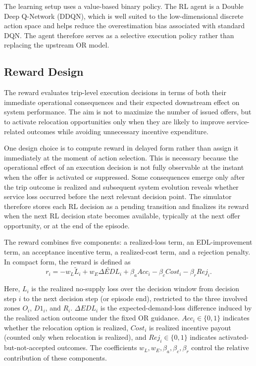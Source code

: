 The learning setup uses a value-based binary policy. The RL agent is a Double Deep Q-Network (DDQN), which is well suited to the low-dimensional discrete action space and helps reduce the overestimation bias associated with standard DQN. The agent therefore serves as a selective execution policy rather than replacing the upstream OR model.

\subsection{Reward Design}

The reward evaluates trip-level execution decisions in terms of both their immediate operational consequences and their expected downstream effect on system performance. The aim is not to maximize the number of issued offers, but to activate relocation opportunities only when they are likely to improve service-related outcomes while avoiding unnecessary incentive expenditure.

One design choice is to compute reward in delayed form rather than assign it immediately at the moment of action selection. This is necessary because the operational effect of an execution decision is not fully observable at the instant when the offer is activated or suppressed. Some consequences emerge only after the trip outcome is realized and subsequent system evolution reveals whether service loss occurred before the next relevant decision point. The simulator therefore stores each RL decision as a pending transition and finalizes its reward when the next RL decision state becomes available, typically at the next offer opportunity, or at the end of the episode.

The reward combines five components: a realized-loss term, an EDL-improvement term, an acceptance incentive term, a realized-cost term, and a rejection penalty. In compact form, the reward is defined as
\begin{equation}
    r_i
    =
    - w_L \widetilde{L}_i
    +
    w_E \widetilde{\Delta EDL}_i
    +
    \beta_a Acc_i
    -
    \beta_c Cost_i
    -
    \beta_r Rej_i.
\end{equation}

Here, \(L_i\) is the realized no-supply loss over the decision window from decision step \(i\) to the next decision step (or episode end), restricted to the three involved zones \(O_i\), \(D1_i\), and \(R_i\). \(\Delta EDL_i\) is the expected-demand-loss difference induced by the realized action outcome under the fixed OR guidance. \(Acc_i\in\{0,1\}\) indicates whether the relocation option is realized, \(Cost_i\) is realized incentive payout (counted only when relocation is realized), and \(Rej_i\in\{0,1\}\) indicates activated-but-not-accepted outcomes. The coefficients \(w_L,w_E,\beta_a,\beta_c,\beta_r\) control the relative contribution of these components.

